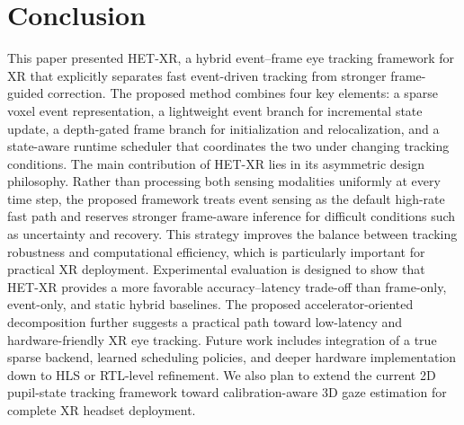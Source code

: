 \documentclass[journal]{IEEEtran}
\begin{document}
\section{Conclusion}
\label{sec:conclusion}
This paper presented HET-XR, a hybrid event--frame eye tracking framework for XR that explicitly separates fast event-driven tracking from stronger frame-guided correction. The proposed method combines four key elements: a sparse voxel event representation, a lightweight event branch for incremental state update, a depth-gated frame branch for initialization and relocalization, and a state-aware runtime scheduler that coordinates the two under changing tracking conditions.
%
The main contribution of HET-XR lies in its asymmetric design philosophy. Rather than processing both sensing modalities uniformly at every time step, the proposed framework treats event sensing as the default high-rate fast path and reserves stronger frame-aware inference for difficult conditions such as uncertainty and recovery. This strategy improves the balance between tracking robustness and computational efficiency, which is particularly important for practical XR deployment.
%
Experimental evaluation is designed to show that HET-XR provides a more favorable accuracy--latency trade-off than frame-only, event-only, and static hybrid baselines. The proposed accelerator-oriented decomposition further suggests a practical path toward low-latency and hardware-friendly XR eye tracking.
%
Future work includes integration of a true sparse backend, learned scheduling policies, and deeper hardware implementation down to HLS or RTL-level refinement. We also plan to extend the current 2D pupil-state tracking framework toward calibration-aware 3D gaze estimation for complete XR headset deployment.



\end{document}
